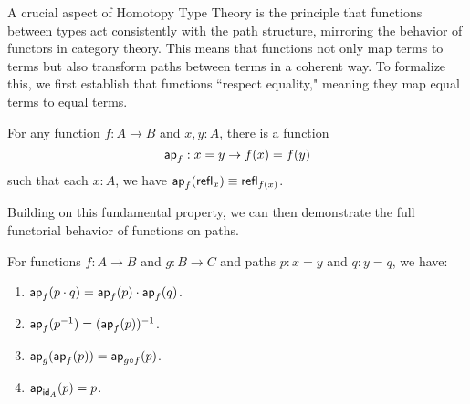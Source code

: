 \documentclass[main.tex]{subfiles}
\begin{document}
A crucial aspect of Homotopy Type Theory is the principle that functions between types act consistently with the path structure, mirroring the behavior of functors in category theory. This means that functions not only map terms to terms but also transform paths between terms in a coherent way. To formalize this, we first establish that functions ``respect equality," meaning they map equal terms to equal terms.
\begin{lemma}
    For any function $f : A \to B$ and $x,y : A$, there is a function
    $$\mathsf{ap}_{f}: x = y \to f(x) = f(y)$$
    such that each $x : A$, we have $\mathsf{ap}_{f}(\mathsf{refl}_{x}) \equiv \mathsf{refl}_{f(x)}$.
\end{lemma}

Building on this fundamental property, we can then demonstrate the full functorial behavior of functions on paths.

\begin{lemma}
    For functions $f : A \to B$ and $g : B \to C$ and paths $p : x = y$ and $q : y = q$, we have:
    \begin{enumerate}
        \item $\mathsf{ap}_{f}(p \cdot q) = \mathsf{ap}_{f}(p)\cdot \mathsf{ap}_{f}(q)$.
        \item $\mathsf{ap}_{f}(p^{-1}) = (\mathsf{ap}_{f}(p))^{-1}$.
        \item $\mathsf{ap}_{g}(\mathsf{ap}_{f}(p)) = \mathsf{ap}_{g \circ f}(p)$.
        \item $\mathsf{ap}_{\mathsf{id}_{A}}(p) = p$.
    \end{enumerate}
\end{lemma}
\end{document}
